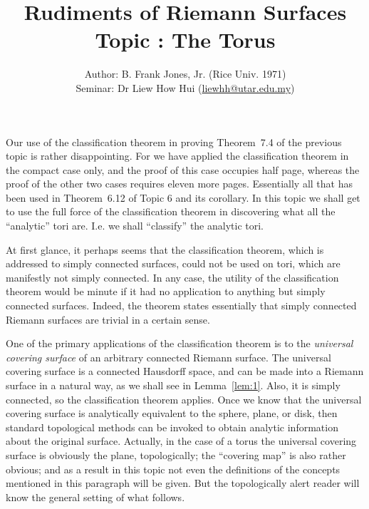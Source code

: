 \documentclass[a4paper,11pt]{article}
\newcounter{topic}
\begin{document}
\title{{\sc Rudiments of Riemann Surfaces\\
    Topic \thetopic{}: The Torus}}
\author{Author: B. Frank Jones, Jr. (Rice Univ. 1971)\\
Seminar: Dr Liew How Hui (\url{liewhh@utar.edu.my})}
\date{}

\maketitle

Our use of the classification theorem in proving Theorem~7.4 of the
previous topic is rather disappointing.  For we have applied the
classification theorem in the compact case only, and the proof of this
case occupies half page, whereas the proof of the other two cases
requires eleven more pages.  Essentially all that has been used in
Theorem~6.12 of Topic 6 and its corollary.  In this topic we shall
get to use the full force of the classification theorem in discovering
what all the ``analytic'' tori are.  I.e. we shall ``classify'' the
analytic tori.

At first glance, it perhaps seems that the classification theorem, 
which is addressed to simply connected surfaces, could not be used on
tori, which are manifestly not simply connected.  In any case, the
utility of the classification theorem would be minute if it had no
application to anything but simply connected surfaces.  Indeed, the
theorem states essentially that simply connected Riemann surfaces are
trivial in a certain sense.

One of the primary applications of the classification theorem is to
the \emph{universal covering surface} of an arbitrary connected
Riemann surface.  The universal covering surface is a connected
Hausdorff space, and can be made into a Riemann surface in a natural
way, as we shall see in Lemma~\ref{lem:1}.  Also, it is simply
connected, so the classification theorem applies.  Once we know that
the universal covering surface is analytically equivalent to the
sphere, plane, or disk, then standard topological methods can be
invoked to obtain analytic information about the original surface.
Actually, in the case of a torus the universal covering surface is
obviously the plane, topologically; the ``covering map'' is also
rather obvious; and as a result in this topic not even the definitions
of the concepts mentioned in this paragraph will be given.  But the
topologically alert reader will know the general setting of what
follows.
\end{document}
